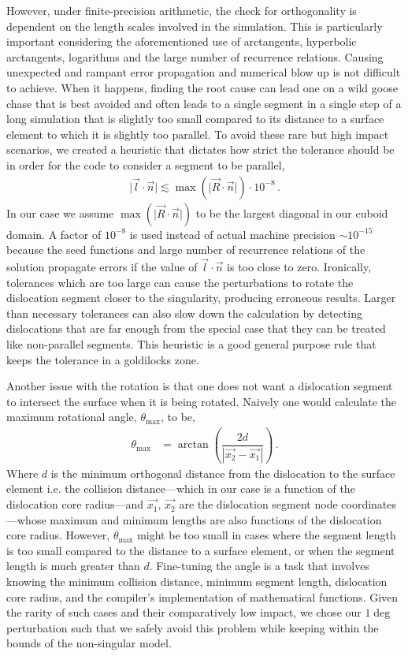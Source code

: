 However, under finite-precision arithmetic, the check for orthogonality is dependent on the length scales involved in the simulation. This is particularly important considering the aforementioned use of arctangents, hyperbolic arctangents, logarithms and the large number of recurrence relations. Causing unexpected and rampant error propagation and numerical blow up is not difficult to achieve. When it happens, finding the root cause can lead one on a wild goose chase that is best avoided and often leads to a single segment in a single step of a long simulation that is slightly too small compared to its distance to a surface element to which it is slightly too parallel. To avoid these rare but high impact scenarios, we created a heuristic that dictates how strict the tolerance should be in order for the code to consider a segment to be parallel,
%
\begin{align}
  \lvert\vec{l}\cdot\vec{n}\rvert \lesssim \max\left(\lvert\vec{R}\cdot\vec{n}\rvert\right) \cdot 10^{-8}\,.
\end{align}
%
In our case we assume $\max\left(\lvert\vec{R}\cdot\vec{n}\rvert\right)$ to be the largest diagonal in our cuboid domain. A factor of $10^{-8}$ is used instead of actual machine precision $\sim10^{-15}$ because the seed functions and large number of recurrence relations of the solution propagate errors if the value of $\vec{l} \cdot \vec{n}$ is too close to zero. Ironically, tolerances which are too large can cause the perturbations to rotate the dislocation segment closer to the singularity, producing erroneous results. Larger than necessary tolerances can also slow down the calculation by detecting dislocations that are far enough from the special case that they can be treated like non-parallel segments. This heuristic is a good general purpose rule that keeps the tolerance in a goldilocks zone.

Another issue with the rotation is that one does not want a dislocation segment to intersect the surface when it is being rotated. Naively one would calculate the maximum rotational angle, $\theta_{\textrm{max}}$, to be,
%
\begin{align}
  \theta_{\textrm{max}} & = \arctan\left(\dfrac{2 d}{\left\lvert\vec{x_2} - \vec{x_1}\right\rvert}\right)\,.
\end{align}
%
Where $d$ is the minimum orthogonal distance from the dislocation to the surface element i.e. the collision distance---which in our case is a function of the dislocation core radius---and $\vec{x_1},\,\vec{x_2}$ are the dislocation segment node coordinates---whose maximum and minimum lengths are also functions of the dislocation core radius. However, $\theta_\textrm{max}$ might be too small in cases where the segment length is too small compared to the distance to a surface element, or when the segment length is much greater than $d$. Fine-tuning the angle is a task that involves knowing the minimum collision distance, minimum segment length, dislocation core radius, and the compiler's implementation of mathematical functions. Given the rarity of such cases and their comparatively low impact, we chose our $1\deg$ perturbation such that we safely avoid this problem while keeping within the bounds of the non-singular model.

